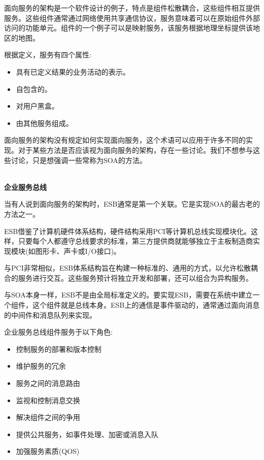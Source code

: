 
面向服务的架构是一个软件设计的例子，特点是组件松散耦合，这些组件相互提供服务。这些组件通常通过网络使用共享通信协议，服务意味着可以在原始组件外部访问的功能单元。组件的一个例子可以是映射服务，该服务根据地理坐标提供该地区的地图。

根据定义，服务有四个属性:

\begin{itemize}
\item 
具有已定义结果的业务活动的表示。

\item 
自包含的。

\item 
对用户黑盒。

\item 
由其他服务组成。
\end{itemize}


面向服务的架构没有规定如何实现面向服务，这个术语可以应用于许多不同的实现。对于某些方法是否应该视为面向服务的架构，存在一些讨论。我们不想参与这些讨论，只是想强调一些常称为SOA的方法。

\hspace*{\fill} \\ %
\noindent
\textbf{企业服务总线}

当有人说到面向服务的架构时，ESB通常是第一个关联。它是实现SOA的最古老的方法之一。

ESB借鉴了计算机硬件体系结构，硬件结构采用PCI等计算机总线实现模块化。这样，只要每个人都遵守总线要求的标准，第三方提供商就能够独立于主板制造商实现模块(如图形卡、声卡或I/O接口)。

与PCI非常相似，ESB体系结构旨在构建一种标准的、通用的方式，以允许松散耦合的服务进行交互。这些服务预计将独立开发和部署，还可以组合为异构服务。

与SOA本身一样，ESB不是由全局标准定义的。要实现ESB，需要在系统中建立一个组件，这个组件就是总线本身。ESB上的通信是事件驱动的，通常通过面向消息的中间件和消息队列来实现。

企业服务总线组件服务于以下角色:

\begin{itemize}
\item 
控制服务的部署和版本控制

\item 
维护服务的冗余

\item 
服务之间的消息路由

\item 
监视和控制消息交换

\item 
解决组件之间的争用

\item 
提供公共服务，如事件处理、加密或消息入队

\item 
加强服务素质(QOS)
\end{itemize}

